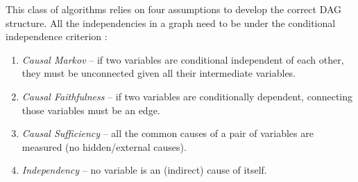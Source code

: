 This class of algorithms relies on four assumptions to develop the correct DAG structure. All the independencies in a graph need to be under the conditional independence criterion \cite{nogueira2021causal}:
\begin{enumerate}
\item \textit{Causal Markov} – if two variables are conditional independent of each other, they must be unconnected given all their intermediate variables.
\item \textit{Causal Faithfulness} – if two variables are conditionally dependent, connecting those variables must be an edge.
\item \textit{Causal Sufficiency} – all the common causes of a pair of variables are measured (no hidden/external causes).
\item \textit{Independency} –  no variable is an (indirect) cause of itself.
\end{enumerate}

